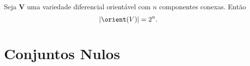 \begin{prop}
Seja $\bm V$ uma variedade diferencial orientável com $n$ componentes conexas. Então
	\begin{equation*}
	\card{\orient(V)} = 2^n.
	\end{equation*}
\end{prop}

\cleardoublepage

\section{Conjuntos Nulos}


